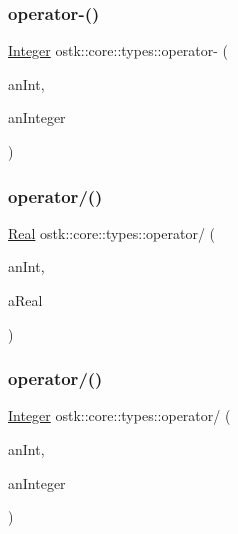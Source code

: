 \subsubsection{\texorpdfstring{operator-\/()}{operator-()}\hspace{0.1cm}{\footnotesize\ttfamily [2/2]}}
{\footnotesize\ttfamily \hyperlink{classostk_1_1core_1_1types_1_1_integer}{Integer} ostk\+::core\+::types\+::operator-\/ (\begin{DoxyParamCaption}\item[{const \hyperlink{classostk_1_1core_1_1types_1_1_integer_a76a5f41f78659f116eafaf26cecc3244}{Integer\+::\+Value\+Type} \&}]{an\+Int,  }\item[{const \hyperlink{classostk_1_1core_1_1types_1_1_integer}{Integer} \&}]{an\+Integer }\end{DoxyParamCaption})}

\mbox{\label{namespaceostk_1_1core_1_1types_aed2e182ada35ed4ba3cdb668302eae0e}} 
\subsubsection{\texorpdfstring{operator/()}{operator/()}\hspace{0.1cm}{\footnotesize\ttfamily [1/2]}}
{\footnotesize\ttfamily \hyperlink{classostk_1_1core_1_1types_1_1_real}{Real} ostk\+::core\+::types\+::operator/ (\begin{DoxyParamCaption}\item[{const \hyperlink{classostk_1_1core_1_1types_1_1_real_aa26f796c30b514c98d573f82e3b02296}{Real\+::\+Value\+Type} \&}]{an\+Int,  }\item[{const \hyperlink{classostk_1_1core_1_1types_1_1_real}{Real} \&}]{a\+Real }\end{DoxyParamCaption})}

\mbox{\label{namespaceostk_1_1core_1_1types_ab07ac6cad9bcf60f52b96b1ad1fdafba}} 
\subsubsection{\texorpdfstring{operator/()}{operator/()}\hspace{0.1cm}{\footnotesize\ttfamily [2/2]}}
{\footnotesize\ttfamily \hyperlink{classostk_1_1core_1_1types_1_1_integer}{Integer} ostk\+::core\+::types\+::operator/ (\begin{DoxyParamCaption}\item[{const \hyperlink{classostk_1_1core_1_1types_1_1_integer_a76a5f41f78659f116eafaf26cecc3244}{Integer\+::\+Value\+Type} \&}]{an\+Int,  }\item[{const \hyperlink{classostk_1_1core_1_1types_1_1_integer}{Integer} \&}]{an\+Integer }\end{DoxyParamCaption})}

